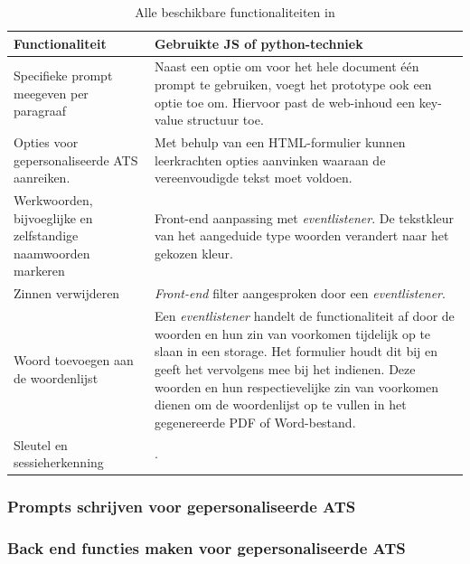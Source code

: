 \begin{center}
	\begin{table}[H]
		\begin{tabular}{ | m{7cm} | m{8cm} | } 
			\hline
			\textbf{Functionaliteit} & Gebruikte JS of python-techniek \\
			\hline
			Specifieke prompt meegeven per paragraaf & Naast een optie om voor het hele document één prompt te gebruiken, voegt het prototype ook een optie toe om. Hiervoor past de web-inhoud een key-value structuur toe. \\
			\hline
			Opties voor gepersonaliseerde ATS aanreiken. & Met behulp van een HTML-formulier kunnen leerkrachten opties aanvinken waaraan de vereenvoudigde tekst moet voldoen. \\
			\hline
			Werkwoorden, bijvoeglijke en zelfstandige naamwoorden markeren & Front-end aanpassing met \textit{eventlistener}. De tekstkleur van het aangeduide type woorden verandert naar het gekozen kleur. \\
			\hline
			Zinnen verwijderen & \textit{Front-end} filter aangesproken door een \textit{eventlistener}. \\
			\hline
			Woord toevoegen aan de woordenlijst & Een \textit{eventlistener} handelt de functionaliteit af door de woorden en hun zin van voorkomen tijdelijk op te slaan in een storage. Het formulier houdt dit bij en geeft het vervolgens mee bij het indienen. Deze woorden en hun respectievelijke zin van voorkomen dienen om de woordenlijst op te vullen in het gegenereerde PDF of Word-bestand. \\ 
			\hline
			Sleutel en sessieherkenning & . \\
			\hline 
		\end{tabular}
	\caption{Alle beschikbare functionaliteiten in }
	\label{table:functionaliteiten-leerkrachten}
	\end{table}
\end{center}

\subsubsection{Prompts schrijven voor gepersonaliseerde ATS}



\subsubsection{Back end functies maken voor gepersonaliseerde ATS}

